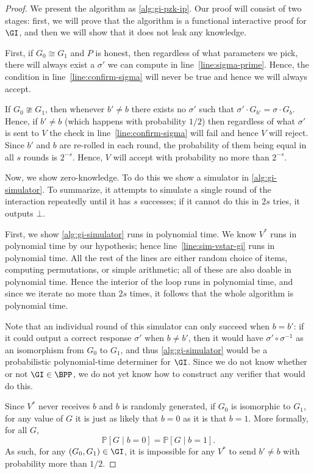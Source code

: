 \documentclass[english,12pt]{reedthesis}
\theoremstyle{plain}
\theoremstyle{definition}
\theoremstyle{remark}
\begin{document}
\begin{proof}
  We present the algorithm as \cref{alg:gi-pzk-ip}. Our proof will consist of
  two stages: first, we will prove that the algorithm is a functional
  interactive proof for $\GI$, and then we will show that it does not leak any
  knowledge.

  First, if $G_{0} \cong G_{1}$ and $P$ is honest, then regardless of what
  parameters we pick, there will always exist a $\sigma'$ we can compute in
  line~\ref{line:sigma-prime}. Hence, the condition in
  line~\ref{line:confirm-sigma} will never be true and hence we will always
  accept.

  If $G_{0} \ncong G_{1}$, then whenever $b' \ne b$ there exists no $\sigma'$ such that
  $\sigma' \cdot G_{b'} = \sigma \cdot G_{b}$. Hence, if $b' \ne b$ (which happens with probability
  $1/2$) then regardless of what $\sigma'$ is sent to $V$ the check in
  line~\ref{line:confirm-sigma} will fail and hence $V$ will reject. Since $b'$
  and $b$ are re-rolled in each round, the probability of them being equal in
  all $s$ rounds is $2^{-s}$. Hence, $V$ will accept with probability no more
  than $2^{-s}$.

  Now, we show zero-knowledge. To do this we show a simulator in
  \cref{alg:gi-simulator}. To summarize, it attempts to simulate a single round
  of the interaction repeatedly until it has $s$ successes; if it cannot do this
  in $2s$ tries, it outputs $\bot$.

  First, we show \cref{alg:gi-simulator} runs in polynomial time. We know
  $V^{*}$ runs in polynomial time by our hypothesis; hence
  line~\ref{line:sim-vstar-gi} runs in polynomial time. All the rest of the
  lines are either random choice of items, computing permutations, or simple
  arithmetic; all of these are also doable in polynomial time. Hence the
  interior of the loop runs in polynomial time, and since we iterate no more
  than $2s$ times, it follows that the whole algorithm is polynomial time.

  Note that an individual round of this simulator can only succeed when
  $b = b'$: if it could output a correct response $\sigma'$ when $b \ne b'$, then it
  would have $\sigma' \circ \sigma^{-1}$ as an isomorphism from $G_{0}$ to $G_{1}$, and thus
  \cref{alg:gi-simulator} would be a probabilistic polynomial-time determiner
  for $\GI$. Since we do not know whether or not $\GI \in \BPP$, we do not yet
  know how to construct any verifier that would do this.

  Since $V^{*}$ never receives $b$ and $b$ is randomly generated, if $G_{0}$ is
  isomorphic to $G_{1}$, for any value of $G$ it is just as likely that $b = 0$
  as it is that $b = 1$. More formally, for all $G$,
  \[
    \mathbb{P}[G \mid b = 0] = \mathbb{P}[G \mid b = 1].
  \]
  As such, for any $(G_{0}, G_{1}) \in \GI$, it is impossible for any $V^{*}$ to
  send $b' \ne b$ with probability more than $1/2$.


\end{proof}
\end{document}
